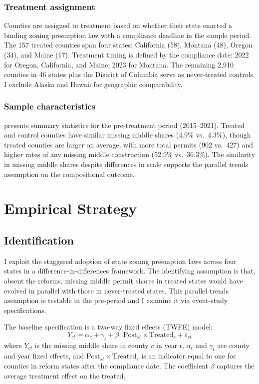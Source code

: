 \documentclass[12pt]{article}
\begin{document}
\subsubsection*{Treatment assignment} Counties are assigned to treatment based on whether their state enacted a binding zoning preemption law with a compliance deadline in the sample period. The 157 treated counties span four states: California (58), Montana (48), Oregon (34), and Maine (17). Treatment timing is defined by the compliance date: 2022 for Oregon, California, and Maine; 2023 for Montana. The remaining 2,910 counties in 46 states plus the District of Columbia serve as never-treated controls. I exclude Alaska and Hawaii for geographic comparability.

\subsubsection*{Sample characteristics}  presents summary statistics for the pre-treatment period (2015--2021). Treated and control counties have similar missing middle shares (4.9\% vs.\ 4.3\%), though treated counties are larger on average, with more total permits (902 vs.\ 427) and higher rates of any missing middle construction (52.9\% vs.\ 36.3\%). The similarity in missing middle shares despite differences in scale supports the parallel trends assumption on the compositional outcome.




\section{Empirical Strategy}
\label{sec:strategy}

\subsection{Identification}

I exploit the staggered adoption of state zoning preemption laws across four states in a difference-in-differences framework. The identifying assumption is that, absent the reforms, missing middle permit shares in treated states would have evolved in parallel with those in never-treated states. This parallel trends assumption is testable in the pre-period and I examine it via event-study specifications.

The baseline specification is a two-way fixed effects (TWFE) model:
\begin{equation}
Y_{ct} = \alpha_c + \gamma_t + \beta \cdot \text{Post}_{st} \times \text{Treated}_s + \varepsilon_{ct}
\label{eq:twfe}
\end{equation}
where $Y_{ct}$ is the missing middle share in county $c$ in year $t$, $\alpha_c$ and $\gamma_t$ are county and year fixed effects, and $\text{Post}_{st} \times \text{Treated}_s$ is an indicator equal to one for counties in reform states after the compliance date. The coefficient $\beta$ captures the average treatment effect on the treated.
\end{document}
